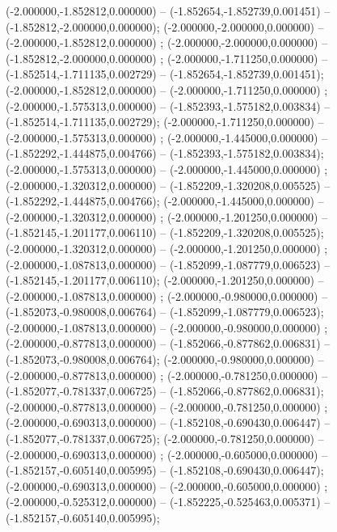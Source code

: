  (-2.000000,-1.852812,0.000000) -- (-1.852654,-1.852739,0.001451) -- (-1.852812,-2.000000,0.000000);
 (-2.000000,-2.000000,0.000000) -- (-2.000000,-1.852812,0.000000) ;
 (-2.000000,-2.000000,0.000000) -- (-1.852812,-2.000000,0.000000) ;
 (-2.000000,-1.711250,0.000000) -- (-1.852514,-1.711135,0.002729) -- (-1.852654,-1.852739,0.001451);
 (-2.000000,-1.852812,0.000000) -- (-2.000000,-1.711250,0.000000) ;
 (-2.000000,-1.575313,0.000000) -- (-1.852393,-1.575182,0.003834) -- (-1.852514,-1.711135,0.002729);
 (-2.000000,-1.711250,0.000000) -- (-2.000000,-1.575313,0.000000) ;
 (-2.000000,-1.445000,0.000000) -- (-1.852292,-1.444875,0.004766) -- (-1.852393,-1.575182,0.003834);
 (-2.000000,-1.575313,0.000000) -- (-2.000000,-1.445000,0.000000) ;
 (-2.000000,-1.320312,0.000000) -- (-1.852209,-1.320208,0.005525) -- (-1.852292,-1.444875,0.004766);
 (-2.000000,-1.445000,0.000000) -- (-2.000000,-1.320312,0.000000) ;
 (-2.000000,-1.201250,0.000000) -- (-1.852145,-1.201177,0.006110) -- (-1.852209,-1.320208,0.005525);
 (-2.000000,-1.320312,0.000000) -- (-2.000000,-1.201250,0.000000) ;
 (-2.000000,-1.087813,0.000000) -- (-1.852099,-1.087779,0.006523) -- (-1.852145,-1.201177,0.006110);
 (-2.000000,-1.201250,0.000000) -- (-2.000000,-1.087813,0.000000) ;
 (-2.000000,-0.980000,0.000000) -- (-1.852073,-0.980008,0.006764) -- (-1.852099,-1.087779,0.006523);
 (-2.000000,-1.087813,0.000000) -- (-2.000000,-0.980000,0.000000) ;
 (-2.000000,-0.877813,0.000000) -- (-1.852066,-0.877862,0.006831) -- (-1.852073,-0.980008,0.006764);
 (-2.000000,-0.980000,0.000000) -- (-2.000000,-0.877813,0.000000) ;
 (-2.000000,-0.781250,0.000000) -- (-1.852077,-0.781337,0.006725) -- (-1.852066,-0.877862,0.006831);
 (-2.000000,-0.877813,0.000000) -- (-2.000000,-0.781250,0.000000) ;
 (-2.000000,-0.690313,0.000000) -- (-1.852108,-0.690430,0.006447) -- (-1.852077,-0.781337,0.006725);
 (-2.000000,-0.781250,0.000000) -- (-2.000000,-0.690313,0.000000) ;
 (-2.000000,-0.605000,0.000000) -- (-1.852157,-0.605140,0.005995) -- (-1.852108,-0.690430,0.006447);
 (-2.000000,-0.690313,0.000000) -- (-2.000000,-0.605000,0.000000) ;
 (-2.000000,-0.525312,0.000000) -- (-1.852225,-0.525463,0.005371) -- (-1.852157,-0.605140,0.005995);
